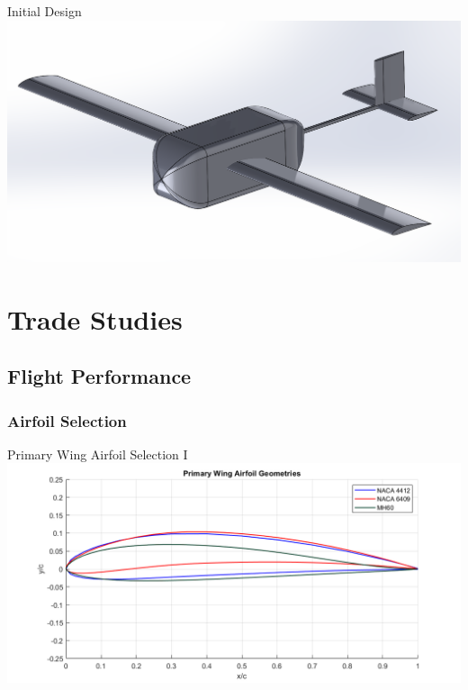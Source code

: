 \documentclass{beamer}
\newcommand{\setpresentername}[1]{\renewcommand{\presentername}{#1}}
\newcommand{\setpresentertitle}[1]{\renewcommand{\presentertitle}{#1}}
\newcommand{\presentername}{}
\newcommand{\presentertitle}{}
\begin{document}
    \begin{frame}{Initial Design}
        \centering
        \includegraphics[width=\linewidth]{figures/isometrics over time/Assem1.0.1Iso.png}
        
    \end{frame}

    \section{Trade Studies}

    \subsection{Flight Performance}

    \subsubsection{Airfoil Selection}
    \setpresentername{Patricia Ovono}
    \setpresentertitle{Flight Performance Engineer}
    

    \begin{frame}{Primary Wing Airfoil Selection I}
        \centering
         \includegraphics[width=\textwidth]{figures/Mainfoils.png}
    \end{frame}
\end{document}
